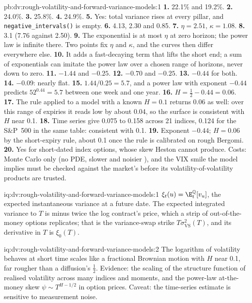 \begin{solution}{pb:dv:rough-volatility-and-forward-variance-models:1}
\textbf{1.} 22.1\% and 19.2\%.
\textbf{2.} 24.0\%.
\textbf{3.} 25.8\%.
\textbf{4.} 24.9\%.
\textbf{5.} Yes: total variance rises at every pillar, and \texttt{negative\_intervals()} is empty.
\textbf{6.} 4.13, 2.30 and 0.85.
\textbf{7.} $\eta=2.51$, $\kappa=1.08$.
\textbf{8.} 3.1 (7.76 against 2.50).
\textbf{9.} The exponential is at most $\eta$ at zero horizon; the power law is infinite there. Two points fix
$\eta$ and $\kappa$, and the curves then differ everywhere else.
\textbf{10.} It adds a fast-decaying term that lifts the short end; a sum of exponentials can imitate the power
law over a chosen range of horizons, never down to zero.
\textbf{11.} $-1.44$ and $-0.25$.
\textbf{12.} $-0.70$ and $-0.25$.
\textbf{13.} $-0.44$ for both.
\textbf{14.} $-0.09$: nearly flat.
\textbf{15.} $1.44/0.25=5.7$, and a power law with exponent $-0.44$ predicts $52^{0.44}=5.7$ between one week and one
year.
\textbf{16.} $H=\frac12-0.44=0.06$.
\textbf{17.} The rule applied to a model with a known $H=0.1$ returns 0.06 as well: over this range of expiries it
reads low by about 0.04, so the surface is consistent with $H$ near 0.1.
\textbf{18.} Time series give 0.075 to 0.158 across 21 indices, 0.124 for the S\&P~500 in the same table: consistent
with 0.1.
\textbf{19.} Exponent $-0.44$; $H=0.06$ by the short-expiry rule, about 0.1 once the rule is calibrated on rough
Bergomi.
\textbf{20.} Yes for short-dated index options, whose skew Heston cannot produce. Costs: Monte Carlo only (no PDE,
slower and noisier ), and the VIX smile the model implies must be checked against the market's before its
volatility-of-volatility products are trusted.
\end{solution}

\begin{solution}{iq:dv:rough-volatility-and-forward-variance-models:1}
$\xi_t(u)=\E^{\mathbb Q}_t[v_u]$, the expected instantaneous variance at a future date. The expected integrated variance
to $T$ is minus twice the log contract's price, which a strip of out-of-the-money options replicates; that is the
variance-swap strike $T\sigma^2_{\mathrm{VS}}(T)$, and its derivative in $T$ is $\xi_0(T)$.
\end{solution}

\begin{solution}{iq:dv:rough-volatility-and-forward-variance-models:2}
The logarithm of volatility behaves at short time scales like a fractional Brownian motion with $H$ near 0.1, far
rougher than a diffusion's $\frac12$. Evidence: the scaling of the structure function of realised volatility across
many indices and moments, and the power-law at-the-money skew $\psi\sim T^{H-1/2}$ in option prices. Caveat: the
time-series estimate is sensitive to measurement noise.
\end{solution}

